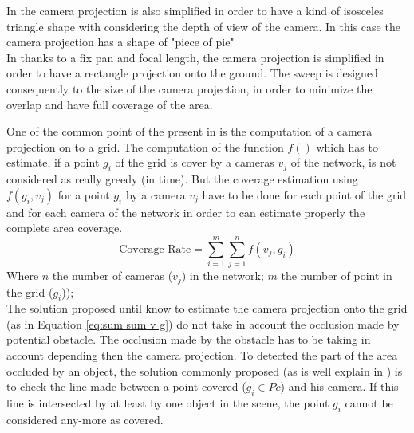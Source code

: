 In \citep{141*akbarzadeh2013} the camera projection is also simplified in order to have a kind of isosceles triangle shape with considering the depth of view of the camera. In this case the  camera projection has a shape of "piece of pie" \\
In \citep{146*li2011} thanks to a fix pan and focal length, the camera projection is simplified in order to have a rectangle projection onto the ground. The sweep is designed consequently to the size of the camera projection, in order to minimize the overlap and have full coverage of the area.  

One of the common point of the present in \cite{87*morsly2012,141*akbarzadeh2013,146*li2011,194*fu2010,22*zhao2008,33*reddy2012,193*fu2014,181*wang2017,165*jiang2010}   is the computation of a camera projection on to a grid. 
The computation of the function $f()$ which has to estimate, if  a point $g_i$ of the grid is cover by a cameras $v_j$ of the network,  is not considered as really greedy (in time). But the coverage estimation using $f(g_i,v_j)$ for a point $g_i$ by a camera $v_j$ have to be done for each point of the grid and for each camera of the network in order to can estimate properly the complete area coverage.
	\begin{equation} \label{eq:sum sum v g}
		\mbox{Coverage Rate}=\sum_{i=1}^{m}\sum_{j=1}^{n}f( v_j,g_i)
	\end{equation} %
Where $n$ the number of cameras ($v_j$) in the network; $m$ the number of point in the grid ($g_i$));  \\
The solution proposed until know to estimate the camera projection onto the grid (as in Equation \ref{eq:sum sum v g})  do not take in account the occlusion made by potential obstacle.
The occlusion  made by  the obstacle has to be taking in account depending then the camera projection.
 To detected the part of the area occluded by an object, the solution commonly proposed (as is well explain in  \citep{181*wang2017}) is to check the line made between a point covered ($g_i \in Pc$) and his camera. If this line is intersected by at least by one object in the scene, the point $g_i$ cannot be considered any-more as covered. 

